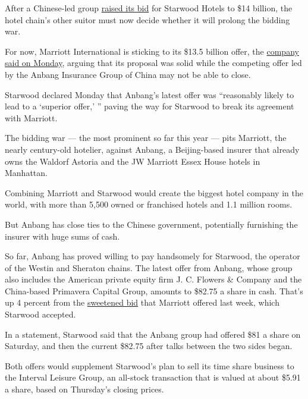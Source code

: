 After a Chinese-led group
\href{http://www.businesswire.com/news/home/20160328005392/en/Starwood-Hotels-Resorts-Board-Directors-Determines-Revised}{raised
its bid} for Starwood Hotels to \$14 billion, the hotel chain's other
suitor must now decide whether it will prolong the bidding war.

For now, Marriott International is sticking to its \$13.5 billion offer,
the
\href{http://www.prnewswire.com/news-releases/marriott-international-reaffirms-its-commitment-to-acquire-starwood-hotels--resorts-worldwide-says-its-signed-deal-provides-greater-long-term-value-for-starwood-stockholders-300241892.html}{company
said on Monday}, arguing that its proposal was solid while the competing
offer led by the Anbang Insurance Group of China may not be able to
close.

Starwood declared Monday that Anbang's latest offer was ``reasonably
likely to lead to a `superior offer,' '' paving the way for Starwood to
break its agreement with Marriott.

The bidding war --- the most prominent so far this year --- pits
Marriott, the nearly century-old hotelier, against Anbang, a
Beijing-based insurer that already owns the Waldorf Astoria and the JW
Marriott Essex House hotels in Manhattan.

Combining Marriott and Starwood would create the biggest hotel company
in the world, with more than 5,500 owned or franchised hotels and 1.1
million rooms.

But Anbang has close ties to the Chinese government, potentially
furnishing the insurer with huge sums of cash.

So far, Anbang has proved willing to pay handsomely for Starwood, the
operator of the Westin and Sheraton chains. The latest offer from
Anbang, whose group also includes the American private equity firm J. C.
Flowers \& Company and the China-based Primavera Capital Group, amounts
to \$82.75 a share in cash. That's up 4 percent from the
\href{http://www.nytimes.com/2016/03/22/business/dealbook/marriott-raises-bid-for-starwood.html}{sweetened
bid} that Marriott offered last week, which Starwood accepted.

In a statement, Starwood said that the Anbang group had offered \$81 a
share on Saturday, and then the current \$82.75 after talks between the
two sides began.

Both offers would supplement Starwood's plan to sell its time share
business to the Interval Leisure Group, an all-stock transaction that is
valued at about \$5.91 a share, based on Thursday's closing prices.

